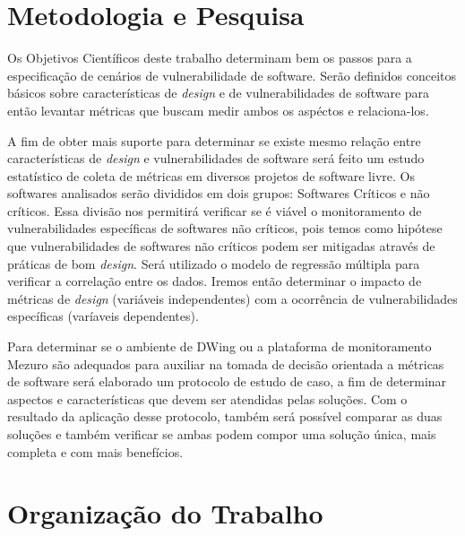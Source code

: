 





\section{Metodologia e Pesquisa}

%

Os Objetivos Científicos deste trabalho determinam bem os passos para a especificação de cenários de vulnerabilidade de software. Serão definidos conceitos básicos sobre características de \emph{design}  e de vulnerabilidades de software para então levantar métricas que buscam medir ambos os aspéctos e relaciona-los.

%

A fim de obter mais suporte para determinar se existe mesmo relação entre características de \emph{design} e vulnerabilidades de software será feito um estudo estatístico de coleta de métricas em diversos projetos de software livre. Os softwares analisados serão divididos em dois grupos: Softwares Críticos e não críticos. Essa divisão nos permitirá verificar se é viável o monitoramento de vulnerabilidades específicas de softwares não críticos, pois temos como hipótese que vulnerabilidades de softwares não críticos podem ser mitigadas através de práticas de bom \emph{design}.  Será utilizado o modelo de regressão múltipla para verificar a correlação entre os dados. Iremos então determinar o impacto de métricas de \emph{design} (variáveis independentes) com a ocorrência de  vulnerabilidades específicas (varíaveis dependentes).

%

Para determinar se o ambiente de DWing ou a plataforma de monitoramento Mezuro são adequados para auxiliar na tomada de decisão orientada a métricas de software será elaborado um protocolo de estudo de caso, a fim de determinar aspectos e características que devem ser atendidas pelas soluções. Com o resultado da aplicação desse protocolo, também será possível comparar as duas soluções e também verificar se ambas podem compor uma solução única, mais completa e com mais benefícios.

%





\section{Organização do Trabalho}

